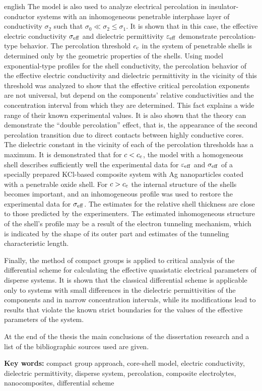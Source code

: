 \begin{otherlanguage*}{english}
The model is also used to analyze electrical percolation in insulator-conductor systems with an inhomogeneous penetrable interphase layer of conductivity $\sigma_2$ such that $ \sigma_0 \ll \sigma_2 \leq \sigma_1 $. It is shown that in this case, the effective electric conductivity $ \sigma _ {\rm eff} $ and dielectric permittivity $ \varepsilon _ {\rm eff} $ demonstrate percolation-type behavior.
The percolation threshold $ c _ {\rm c} $ in the system of penetrable shells is determined only by the geometric properties of the shells.  Using model exponential-type profiles for the shell conductivity, the percolation behavior of the effective electric conductivity and dielectric permittivity in the vicinity of this threshold was analyzed to show that the effective critical percolation exponents are not universal, but depend on the components' relative conductivities and the concentration interval from which they are determined. This fact explains a wide range of their known experimental values.
It is also shown that the theory can demonstrate the ``double percolation'' effect, that is, the appearance of the second percolation transition due to direct contacts between highly conductive cores. The dielectric constant in the vicinity of each of the percolation thresholds has a maximum.
It is demonstrated that for $c<c_{\rm c}$, the model with a homogeneous shell describes sufficiently well the experimental data for $ \varepsilon _ {\rm eff} $ and $ \sigma _ {\rm eff} $ of a specially prepared KCl-based composite  system with Ag nanoparticles coated with a penetrable oxide shell. For $ c> c _ {\rm c} $ the internal structure of the shells becomes important, and an inhomogeneous profile was used to restore the experimental data for $ \sigma _ {\rm eff} $. The  estimates for the relative shell thickness are close to those predicted by the experimenters. The estimated inhomogeneous structure of the shell's profile may be a result of the electron tunneling mechanism, which is indicated by the shape of its outer part and estimates of the tunneling characteristic length.

Finally, the method of compact groups is applied to critical analysis of the differential scheme for calculating the effective quasistatic electrical parameters of disperse systems. It is shown that the classical differential scheme is applicable only to systems with small differences in the dielectric permittivities of the components and in narrow concentration intervals, while its modifications lead to results that violate the known strict boundaries for the values of the effective parameters of the system.

At the end of the thesis the main conclusions of the dissertation  research and a list of the bibliographic sources used are given.

\vskip 15pt
\textbf{Key words:} compact group approach, core-shell model, electric conduc\-tivity, dielectric permittivity, disperse system, percolation, composite electro\-lytes, nanocomposites, differential scheme

\end{otherlanguage*}